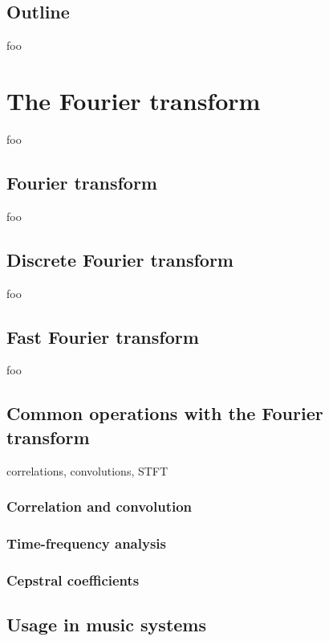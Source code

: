 \documentclass[letter,12pt]{article}
\begin{document}
\subsection{Outline}

foo

\section{The Fourier transform}

foo

\subsection{Fourier transform}

foo

\subsection{Discrete Fourier transform}

foo

\subsection{Fast Fourier transform}

foo

\subsection{Common operations with the Fourier transform}

correlations, convolutions, STFT

\subsubsection{Correlation and convolution}

\subsubsection{Time-frequency analysis}

\subsubsection{Cepstral coefficients}

\subsection{Usage in music systems}
\end{document}
